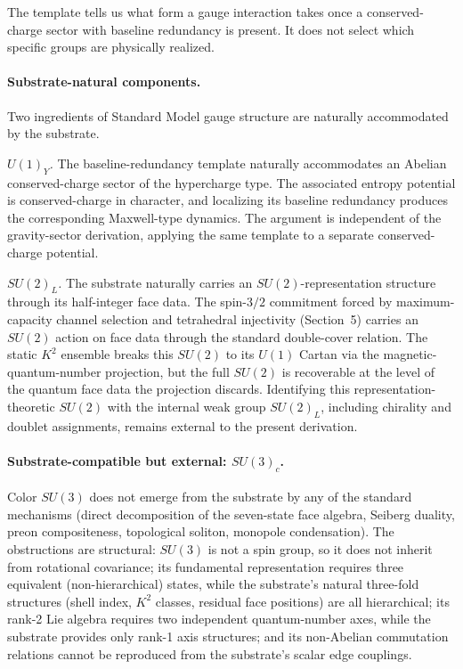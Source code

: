 \documentclass[11pt]{article}
\begin{document}
The template tells us what form a gauge interaction takes once a conserved-charge sector with baseline redundancy is present. It does not select which specific groups are physically realized.

\paragraph{Substrate-natural components.}
Two ingredients of Standard Model gauge structure are naturally accommodated by the substrate.

\emph{$U(1)_Y$.} The baseline-redundancy template naturally accommodates an Abelian conserved-charge sector of the hypercharge type. The associated entropy potential is conserved-charge in character, and localizing its baseline redundancy produces the corresponding Maxwell-type dynamics. The argument is independent of the gravity-sector derivation, applying the same template to a separate conserved-charge potential.

\emph{$SU(2)_L$.} The substrate naturally carries an $SU(2)$-representation structure through its half-integer face data. The spin-$3/2$ commitment forced by maximum-capacity channel selection and tetrahedral injectivity (Section~5) carries an $SU(2)$ action on face data through the standard double-cover relation. The static $K^2$ ensemble breaks this $SU(2)$ to its $U(1)$ Cartan via the magnetic-quantum-number projection, but the full $SU(2)$ is recoverable at the level of the quantum face data the projection discards. Identifying this representation-theoretic $SU(2)$ with the internal weak group $SU(2)_L$, including chirality and doublet assignments, remains external to the present derivation.

\paragraph{Substrate-compatible but external: $SU(3)_c$.}
Color $SU(3)$ does not emerge from the substrate by any of the standard mechanisms (direct decomposition of the seven-state face algebra, Seiberg duality, preon compositeness, topological soliton, monopole condensation). The obstructions are structural: $SU(3)$ is not a spin group, so it does not inherit from rotational covariance; its fundamental representation requires three equivalent (non-hierarchical) states, while the substrate's natural three-fold structures (shell index, $K^2$ classes, residual face positions) are all hierarchical; its rank-2 Lie algebra requires two independent quantum-number axes, while the substrate provides only rank-1 axis structures; and its non-Abelian commutation relations cannot be reproduced from the substrate's scalar edge couplings.
\end{document}
